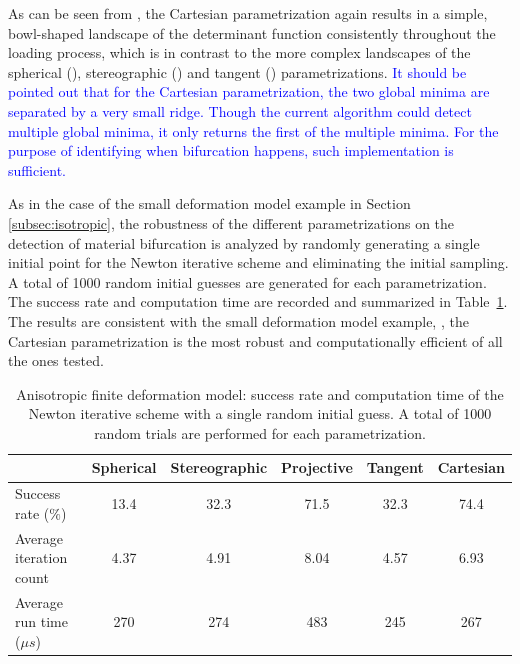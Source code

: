 \documentclass[12pt]{article}
\numberwithin{equation}{section}
\begin{document}
As can be seen from , the Cartesian
parametrization again results in a simple, bowl-shaped landscape of
the determinant function consistently throughout the loading process,
which is in contrast to the more complex landscapes of the spherical
(), stereographic
() and tangent
() parametrizations.
\textcolor{blue}{It should be pointed out that for the Cartesian
parametrization, the two global minima are separated by a very small
ridge. Though the current algorithm could detect multiple global
minima, it only returns the first of the multiple minima. For the
purpose of identifying when bifurcation happens, such implementation is
sufficient.}

As in the case of the small deformation model example in Section
\ref{subsec:isotropic}, the robustness of the different
parametrizations on the detection of material bifurcation is analyzed
by randomly generating a single initial point for the Newton iterative
scheme and eliminating the initial sampling. A total of 1000 random
initial guesses are generated for each parametrization. The success
rate and computation time are recorded and summarized in
Table~\ref{tab:aniso-axial-random-para}. The results are consistent
with the small deformation model example, \ie, the Cartesian
parametrization is the most robust and computationally efficient of
all the ones tested.

\begin{table}[!htbp]
 \begin{center}
  \begin{tabular}{l | c c c c c}
    \toprule
    & Spherical & Stereographic & Projective & Tangent & Cartesian     \\
    \midrule
    Success rate ($\%$)      & 13.4 & 32.3  & 71.5  & 32.3  &  74.4   \\
    Average iteration count    & 4.37 & 4.91 & 8.04  & 4.57 & 6.93   \\
    Average run time (${\mu}s$)  & 270  & 274  & 483  & 245  & 267   \\
    \bottomrule
  \end{tabular}
  \caption{Anisotropic finite deformation model: success rate and
    computation time of the Newton iterative scheme with a single random
    initial guess. A total of 1000 random trials are performed for
    each parametrization.}
    \label{tab:aniso-axial-random-para}
 \end{center}
\end{table}
\end{document}
